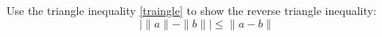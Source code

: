 \documentclass[openany]{book}
\begin{document}
\begin{prob}
    Use the triangle inequality \ref{traingle} to show the reverse triangle inequality:
    \begin{equation*}
        \bigg|\|a\|-\|b\|\bigg|\leq\|a-b\|
    \end{equation*}
\end{prob}
\end{document}
